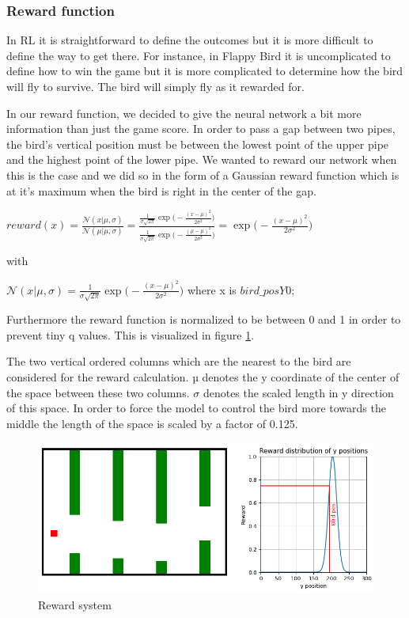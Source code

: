 \subsubsection{Reward function}
In RL it is straightforward to define the outcomes but it is more difficult to define the way to get there.
For instance, in Flappy Bird it is uncomplicated to define how to win the game but it is more complicated to determine how the bird will fly to survive. The bird will simply fly as it rewarded for.
\par
In our reward function, we decided to give the neural network a bit more information than just the game score. In order to pass a gap between two pipes, the bird's vertical position must be between the lowest point of the upper pipe and the highest point of the lower pipe. We wanted to reward our network when this is the case and we did so in the form of a Gaussian reward function which is at it's maximum when the bird is right in the center of the gap.
\par


$reward(x)  
= \frac{\mathcal{N}(x|\mu, \sigma)}{\mathcal{N}(\mu|\mu, \sigma)}  
= \frac{\mathrm{}\frac{1}{\sigma\sqrt{2\pi}} \exp{\biggl(-\frac{(x - \mu)^{2}}{2\sigma^{2}} \biggr)}} 
{\mathrm{}\frac{1}{\sigma\sqrt{2\pi}} \exp{\biggl(-\frac{(\mu - \mu)^{2}}{2\sigma^{2}} \biggr)}}  
= \exp{\biggl(-\frac{(x - \mu)^{2}}{2\sigma^{2}} \biggr)}$

with 

$\mathcal{N}(x|\mu, \sigma) = \mathrm{}\frac{1}{\sigma\sqrt{2\pi}} \exp{\biggl(-\frac{(x - \mu)^{2}}{2\sigma^{2}} \biggr)} $
where  x is $bird\_posY0$; 
\par
Furthermore the reward function is normalized to be between 0 and 1 in order to prevent tiny q values. This is visualized in figure \ref{fig:Rewardsystem}.
\par
The two vertical ordered columns which are the nearest to the bird are considered for the reward calculation. µ denotes the y coordinate of the center of the space between these two columns. 
$\sigma$ denotes the scaled length in y direction of this space. In order to force the model to control the bird more towards the middle the length of the space is scaled by a factor of 0.125.
\begin{figure}
    \centering
    \includegraphics[width=\textwidth]{media/rewardSystem.png}
    \caption{Reward system}
    \label{fig:Rewardsystem}
\end{figure}


